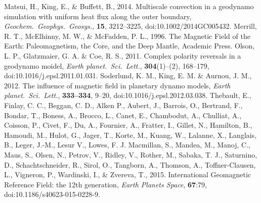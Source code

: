 \begin{thebibliography}{}
%
Matsui, H., King, E., \& Buffett, B., 2014. Multiscale convection in a geodynamo simulation with uniform heat flux along the outer boundary, {\it Geochem.\ Geophys.\ Geosys.}, {\bf 15},  3212--3225, doi:10.1002/2014GC005432.
%
Merrill, R. T., McElhinny, M. W., \& McFadden, P. L., 1996. The Magnetic Field of the Earth: Paleomagnetism, the Core, and the Deep Mantle, Academic Press.
%
Olson, L. P., Glatzmaier, G. A. \& Coe, R. S., 2011. Complex polarity reversals in a geodynamo moidel, {\it Earth planet.\ Sci.\ Lett.}, {\bf 304}(1)--(2), 168--179, doi:10.1016/j.epsl.2011.01.031.
%
Soderlund, K. M., King, E. M. \& Aurnou, J. M., 2012. The influence of magnetic field in planetary dynamo models, {\it Earth planet.\ Sci.\ Lett.}, {\bf 333--334}, 9--20, doi:10.1016/j.epsl.2012.03.038.
%
Thebault, E., Finlay, C. C., Beggan, C. D., Alken P., Aubert, J., Barrois, O., Bertrand, F., Bondar, T., Boness, A., Brocco, L., Canet, E., Chambodut, A., Chulliat, A., Coisson, P., Civet, F., Du, A., Fournier, A., Fratter, I., Gillet, N., Hamilton, B., Hamoudi, M., Hulot, G., Jager, T., Korte, M., Kuang, W., Lalanne, X., Langlais, B., Leger, J.-M., Lesur V., Lowes, F. J. Macmillan, S., Mandea, M., Manoj, C., Maus, S., Olsen, N., Petrov, V., Ridley, V., Rother, M., Sabaka, T. J., Saturnino, D., Schachtschneider, R., Sirol, O., Tangborn, A., Thomson, A., Toffner-Clausen, L., Vigneron, P., Wardinski, I., \& Zvereva, T., 2015. International Geomagnetic Reference Field: the 12th generation, {\it Earth Planets Space}, {\bf 67}:79, doi:10.1186/s40623-015-0228-9.
%

\end{thebibliography}
